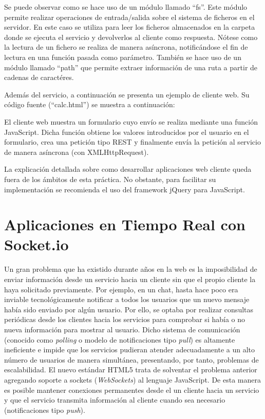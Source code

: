 \documentclass[12pt, a4paper, spanish]{scrartcl}
\begin{document}
Se puede observar como se hace uso de un módulo llamado ``fs''. Este módulo permite realizar operaciones de entrada/salida sobre el sistema de ficheros en el servidor. En este caso se utiliza para leer los ficheros almacenados en la carpeta donde se ejecuta el servicio y devolverlos al cliente como respuesta. Nótese como la lectura de un fichero se realiza de manera asíncrona, notificándose el fin de lectura en una función pasada como parámetro. También se hace uso de un módulo llamado ``path'' que permite extraer información de una ruta a partir de cadenas de caractéres.

Además del servicio, a continuación se presenta un ejemplo de cliente web. Su código fuente (``calc.html'') se muestra a continuación:



El cliente web muestra un formulario cuyo envío se realiza mediante una función JavaScript. Dicha función obtiene los valores introducidos por el usuario en el formulario, crea una petición tipo REST y finalmente envía la petición al servicio de manera asíncrona (con XMLHttpRequest).

La explicación detallada sobre como desarrollar aplicaciones web cliente queda fuera de los ámbitos de esta práctica. No obstante, para facilitar su implementación se recomienda el uso del framework jQuery para JavaScript.

\section{Aplicaciones en Tiempo Real con Socket.io}

Un gran problema que ha existido durante años en la web es la imposibilidad de enviar información desde un servicio hacia un cliente sin que el propio cliente la haya solicitado previamente. Por ejemplo, en un chat, hasta hace poco era inviable tecnológicamente notificar a todos los usuarios que un nuevo mensaje había sido enviado por algún usuario. Por ello, se optaba por realizar consultas periódicas desde los clientes hacia los servicios para comprobar si había o no nueva información para mostrar al usuario. Dicho sistema de comunicación (conocido como \emph{polling} o modelo de notificaciones tipo \emph{pull}) es altamente ineficiente e impide que los servicios pudieran atender adecuadamente a un alto número de usuarios de manera simultánea, presentando, por tanto, problemas de escalabilidad. El nuevo estándar HTML5 trata de solventar el problema anterior agregando soporte a sockets (\emph{WebSockets}) al lenguaje JavaScript. De esta manera es posible mantener conexiones permanentes desde el un  cliente hacia un servicio y que el servicio transmita información al cliente cuando sea necesario (notificaciones tipo \emph{push}).
\end{document}
